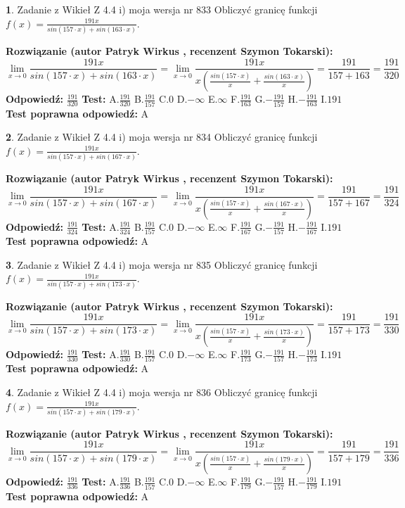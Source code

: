 \documentclass[12pt, a4paper]{article}
\theoremstyle{definition} %
\newtheorem{zad}{}
\newcommand{\zadStart}[1]{\begin{zad}#1\newline}
\newcommand{\zadStop}{\end{zad}}
\newcommand{\rozwStart}[2]{\noindent \textbf{Rozwiązanie (autor #1 , recenzent #2): }\newline}
\newcommand{\rozwStop}{\newline}
\newcommand{\odpStart}{\noindent \textbf{Odpowiedź:}\newline}
\newcommand{\odpStop}{\newline}
\newcommand{\testStart}{\noindent \textbf{Test:}\newline}
\newcommand{\testStop}{\newline}
\newcommand{\kluczStart}{\noindent \textbf{Test poprawna odpowiedź:}\newline}
\newcommand{\kluczStop}{\newline}
\begin{document}
\zadStart{Zadanie z Wikieł Z 4.4 i) moja wersja nr 833}
Obliczyć granicę funkcji $f(x)=\frac{191x}{sin(157\cdot x) +sin(163\cdot x)}$.
\zadStop
\rozwStart{Patryk Wirkus}{Szymon Tokarski}
$$\lim\limits_{x\to 0}\frac{191x}{sin(157\cdot x) +sin(163\cdot x)}=\lim\limits_{x\to 0}\frac{191x}{x(\frac{sin(157\cdot x)}{x}+\frac{sin(163\cdot x)}{x})}=\frac{191}{157+163} = \frac{191}{320}$$
\rozwStop
\odpStart
$\frac{191}{320}$
\odpStop
\testStart
A.$\frac{191}{320}$
B.$\frac{191}{157}$
C.$0$
D.$-\infty$
E.$\infty$
F.$\frac{191}{163}$
G.$-\frac{191}{157}$
H.$-\frac{191}{163}$
I.$191$
\testStop
\kluczStart
A
\kluczStop



\zadStart{Zadanie z Wikieł Z 4.4 i) moja wersja nr 834}
Obliczyć granicę funkcji $f(x)=\frac{191x}{sin(157\cdot x) +sin(167\cdot x)}$.
\zadStop
\rozwStart{Patryk Wirkus}{Szymon Tokarski}
$$\lim\limits_{x\to 0}\frac{191x}{sin(157\cdot x) +sin(167\cdot x)}=\lim\limits_{x\to 0}\frac{191x}{x(\frac{sin(157\cdot x)}{x}+\frac{sin(167\cdot x)}{x})}=\frac{191}{157+167} = \frac{191}{324}$$
\rozwStop
\odpStart
$\frac{191}{324}$
\odpStop
\testStart
A.$\frac{191}{324}$
B.$\frac{191}{157}$
C.$0$
D.$-\infty$
E.$\infty$
F.$\frac{191}{167}$
G.$-\frac{191}{157}$
H.$-\frac{191}{167}$
I.$191$
\testStop
\kluczStart
A
\kluczStop



\zadStart{Zadanie z Wikieł Z 4.4 i) moja wersja nr 835}
Obliczyć granicę funkcji $f(x)=\frac{191x}{sin(157\cdot x) +sin(173\cdot x)}$.
\zadStop
\rozwStart{Patryk Wirkus}{Szymon Tokarski}
$$\lim\limits_{x\to 0}\frac{191x}{sin(157\cdot x) +sin(173\cdot x)}=\lim\limits_{x\to 0}\frac{191x}{x(\frac{sin(157\cdot x)}{x}+\frac{sin(173\cdot x)}{x})}=\frac{191}{157+173} = \frac{191}{330}$$
\rozwStop
\odpStart
$\frac{191}{330}$
\odpStop
\testStart
A.$\frac{191}{330}$
B.$\frac{191}{157}$
C.$0$
D.$-\infty$
E.$\infty$
F.$\frac{191}{173}$
G.$-\frac{191}{157}$
H.$-\frac{191}{173}$
I.$191$
\testStop
\kluczStart
A
\kluczStop



\zadStart{Zadanie z Wikieł Z 4.4 i) moja wersja nr 836}
Obliczyć granicę funkcji $f(x)=\frac{191x}{sin(157\cdot x) +sin(179\cdot x)}$.
\zadStop
\rozwStart{Patryk Wirkus}{Szymon Tokarski}
$$\lim\limits_{x\to 0}\frac{191x}{sin(157\cdot x) +sin(179\cdot x)}=\lim\limits_{x\to 0}\frac{191x}{x(\frac{sin(157\cdot x)}{x}+\frac{sin(179\cdot x)}{x})}=\frac{191}{157+179} = \frac{191}{336}$$
\rozwStop
\odpStart
$\frac{191}{336}$
\odpStop
\testStart
A.$\frac{191}{336}$
B.$\frac{191}{157}$
C.$0$
D.$-\infty$
E.$\infty$
F.$\frac{191}{179}$
G.$-\frac{191}{157}$
H.$-\frac{191}{179}$
I.$191$
\testStop
\kluczStart
A
\kluczStop
\end{document}

